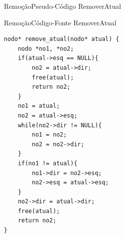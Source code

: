 \documentclass[aspectratio=169]{beamer}
\begin{document}

\begin{frame}{Remoção}{Pseudo-Código RemoverAtual}
\end{frame}


\begin{frame}[fragile]{Remoção}{Código-Fonte RemoverAtual}
\begin{lstlisting}[style=CStyle,basicstyle=\tiny]
nodo* remove_atual(nodo* atual) {
    nodo *no1, *no2;
    if(atual->esq == NULL){
        no2 = atual->dir;
        free(atual);
        return no2;
    }
    no1 = atual;
    no2 = atual->esq;
    while(no2->dir != NULL){
        no1 = no2;
        no2 = no2->dir;
    }
    if(no1 != atual){
        no1->dir = no2->esq;
        no2->esq = atual->esq;
    }
    no2->dir = atual->dir;
    free(atual);
    return no2;
}
\end{lstlisting}  
\end{frame}

\end{document}
